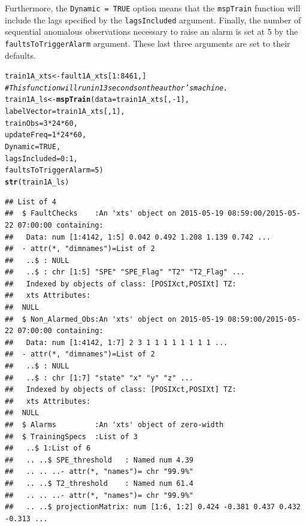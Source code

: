 \documentclass{report}\usepackage[]{graphicx}\usepackage[]{color}
\makeatletter
\newcommand{\hlnum}[1]{\textcolor[rgb]{0.686,0.059,0.569}{#1}}%
\newcommand{\hlcom}[1]{\textcolor[rgb]{0.678,0.584,0.686}{\textit{#1}}}%
\newcommand{\hlopt}[1]{\textcolor[rgb]{0,0,0}{#1}}%
\newcommand{\hlstd}[1]{\textcolor[rgb]{0.345,0.345,0.345}{#1}}%
\newcommand{\hlkwb}[1]{\textcolor[rgb]{0.69,0.353,0.396}{#1}}%
\newcommand{\hlkwc}[1]{\textcolor[rgb]{0.333,0.667,0.333}{#1}}%
\newcommand{\hlkwd}[1]{\textcolor[rgb]{0.737,0.353,0.396}{\textbf{#1}}}%
\newenvironment{kframe}{%
 \def\at@end@of@kframe{}%
 \ifinner\ifhmode%
  \def\at@end@of@kframe{\end{minipage}}%
  \begin{minipage}{\columnwidth}%
 \fi\fi%
 \def\FrameCommand##1{\hskip\@totalleftmargin \hskip-\fboxsep
 \colorbox{shadecolor}{##1}\hskip-\fboxsep
     \hskip-\linewidth \hskip-\@totalleftmargin \hskip\columnwidth}%
 \MakeFramed {\advance\hsize-\width
   \@totalleftmargin\z@ \linewidth\hsize
   \@setminipage}}%
 {\par\unskip\endMakeFramed%
 \at@end@of@kframe}
\newenvironment{knitrout}{}{} %
\makeatother
\begin{document}
Furthermore, the \texttt{Dynamic = TRUE} option means that the \texttt{mspTrain} function will include the lags specified by the \texttt{lagsIncluded} argument. Finally, the number of sequential anomalous observations necessary to raise an alarm is set at 5 by the \texttt{faultsToTriggerAlarm} argument. These last three arguments are set to their defaults.
\begin{knitrout}
\color{fgcolor}\begin{kframe}
\begin{alltt}
\hlstd{train1A_xts} \hlkwb{<-} \hlstd{fault1A_xts[}\hlnum{1}\hlopt{:}\hlnum{8461}\hlstd{,]}
\hlcom{# This function will run in 13 seconds on the author's machine.}
\hlstd{train1A_ls} \hlkwb{<-} \hlkwd{mspTrain}\hlstd{(}\hlkwc{data} \hlstd{= train1A_xts[,}\hlopt{-}\hlnum{1}\hlstd{],}
                       \hlkwc{labelVector} \hlstd{= train1A_xts[,}\hlnum{1}\hlstd{],}
                       \hlkwc{trainObs} \hlstd{=} \hlnum{3} \hlopt{*} \hlnum{24} \hlopt{*} \hlnum{60}\hlstd{,}
                       \hlkwc{updateFreq} \hlstd{=} \hlnum{1} \hlopt{*} \hlnum{24} \hlopt{*} \hlnum{60}\hlstd{,}
                       \hlkwc{Dynamic} \hlstd{=} \hlnum{TRUE}\hlstd{,}
                       \hlkwc{lagsIncluded} \hlstd{=} \hlnum{0}\hlopt{:}\hlnum{1}\hlstd{,}
                       \hlkwc{faultsToTriggerAlarm} \hlstd{=} \hlnum{5}\hlstd{)}
\hlkwd{str}\hlstd{(train1A_ls)}
\end{alltt}
\begin{verbatim}
## List of 4
##  $ FaultChecks    :An 'xts' object on 2015-05-19 08:59:00/2015-05-22 07:00:00 containing:
##   Data: num [1:4142, 1:5] 0.042 0.492 1.208 1.139 0.742 ...
##  - attr(*, "dimnames")=List of 2
##   ..$ : NULL
##   ..$ : chr [1:5] "SPE" "SPE_Flag" "T2" "T2_Flag" ...
##   Indexed by objects of class: [POSIXct,POSIXt] TZ: 
##   xts Attributes:  
##  NULL
##  $ Non_Alarmed_Obs:An 'xts' object on 2015-05-19 08:59:00/2015-05-22 07:00:00 containing:
##   Data: num [1:4142, 1:7] 2 3 1 1 1 1 1 1 1 1 ...
##  - attr(*, "dimnames")=List of 2
##   ..$ : NULL
##   ..$ : chr [1:7] "state" "x" "y" "z" ...
##   Indexed by objects of class: [POSIXct,POSIXt] TZ: 
##   xts Attributes:  
##  NULL
##  $ Alarms         :An 'xts' object of zero-width
##  $ TrainingSpecs  :List of 3
##   ..$ 1:List of 6
##   .. ..$ SPE_threshold   : Named num 4.39
##   .. .. ..- attr(*, "names")= chr "99.9%"
##   .. ..$ T2_threshold    : Named num 61.4
##   .. .. ..- attr(*, "names")= chr "99.9%"
##   .. ..$ projectionMatrix: num [1:6, 1:2] 0.424 -0.381 0.437 0.432 -0.313 ...

\end{verbatim}
\end{kframe}
\end{knitrout}
\end{document}

